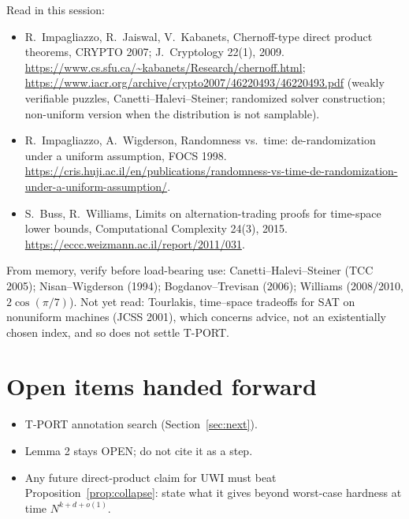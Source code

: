 \documentclass[11pt]{article}
\theoremstyle{remark}
\begin{document}
Read in this session:
\begin{itemize}
\item R.~Impagliazzo, R.~Jaiswal, V.~Kabanets, Chernoff-type direct product theorems, CRYPTO 2007;
J.~Cryptology 22(1), 2009. \url{https://www.cs.sfu.ca/~kabanets/Research/chernoff.html};
\url{https://www.iacr.org/archive/crypto2007/46220493/46220493.pdf} (weakly verifiable puzzles,
Canetti--Halevi--Steiner; randomized solver construction; non-uniform version when the distribution is
not samplable).
\item R.~Impagliazzo, A.~Wigderson, Randomness vs.\ time: de-randomization under a uniform assumption,
FOCS 1998. \url{https://cris.huji.ac.il/en/publications/randomness-vs-time-de-randomization-under-a-uniform-assumption/}.
\item S.~Buss, R.~Williams, Limits on alternation-trading proofs for time-space lower bounds,
Computational Complexity 24(3), 2015. \url{https://eccc.weizmann.ac.il/report/2011/031}.
\end{itemize}
From memory, verify before load-bearing use: Canetti--Halevi--Steiner (TCC 2005); Nisan--Wigderson (1994);
Bogdanov--Trevisan (2006); Williams (2008/2010, $2\cos(\pi/7)$). Not yet read: Tourlakis, time--space
tradeoffs for SAT on nonuniform machines (JCSS 2001), which concerns advice, not an existentially chosen
index, and so does not settle T-PORT.

\section{Open items handed forward}
\begin{itemize}
\item T-PORT annotation search (Section~\ref{sec:next}).
\item Lemma 2 stays OPEN; do not cite it as a step.
\item Any future direct-product claim for UWI must beat Proposition~\ref{prop:collapse}: state what it
gives beyond worst-case hardness at time $N^{k+d+o(1)}$.
\end{itemize}
\end{document}
